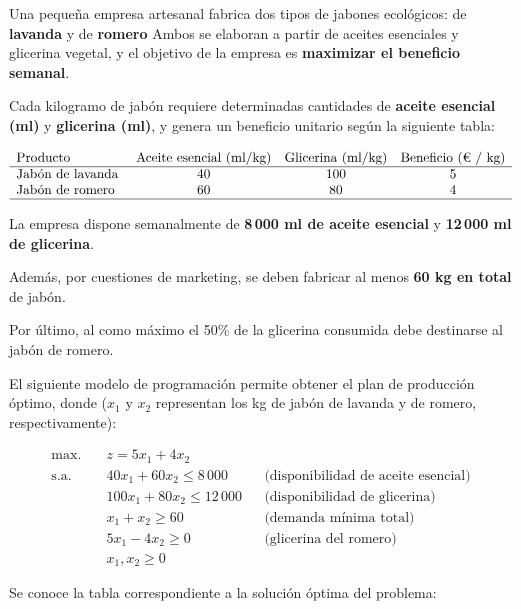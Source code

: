 Una pequeña empresa artesanal fabrica dos tipos de jabones ecológicos: de \textbf{lavanda}  y de \textbf{romero}  Ambos se elaboran a partir de aceites esenciales y glicerina vegetal, y el objetivo de la empresa es \textbf{maximizar el beneficio semanal}.

Cada kilogramo de jabón requiere determinadas cantidades de \textbf{aceite esencial (ml)} y \textbf{glicerina (ml)}, y genera un beneficio unitario según la siguiente tabla:

\[
\begin{array}{lccc}
\text{Producto} & \text{Aceite esencial (ml/kg)} & \text{Glicerina (ml/kg)} & \text{Beneficio (€ / kg)} \\
\hline
\text{Jabón de lavanda } & 40 & 100 & 5 \\
\text{Jabón de romero }  & 60 & 80  & 4 \\
\hline
\end{array}
\]

La empresa dispone semanalmente de \textbf{8\,000 ml de aceite esencial} y \textbf{12\,000 ml de glicerina}. 

Además, por cuestiones de marketing, se deben fabricar al menos \textbf{60 kg en total} de jabón.

Por último, al como máximo el 50\% de la glicerina consumida debe destinarse al jabón de romero.

El siguiente modelo de programación permite obtener el plan de producción óptimo, donde ($x_1$ y $x_2$ representan los kg de jabón de lavanda y de romero, respectivamente):

\[
\begin{aligned}
\mbox{max.} \quad & z = 5x_1 + 4x_2 \\
\text{s.a.} \quad 
& 40x_1 + 60x_2 \le 8\,000 & & \text{(disponibilidad de aceite esencial)} \\
& 100x_1 + 80x_2 \le 12\,000 & & \text{(disponibilidad de glicerina)} \\
& x_1 + x_2 \ge 60 & & \text{(demanda mínima total)} \\
& 5x_1 - 4x_2 \ge 0 & & \text{(glicerina del romero)} \\
& x_1, x_2 \ge 0
\end{aligned}
\]

Se conoce la tabla correspondiente a la solución óptima del problema:


